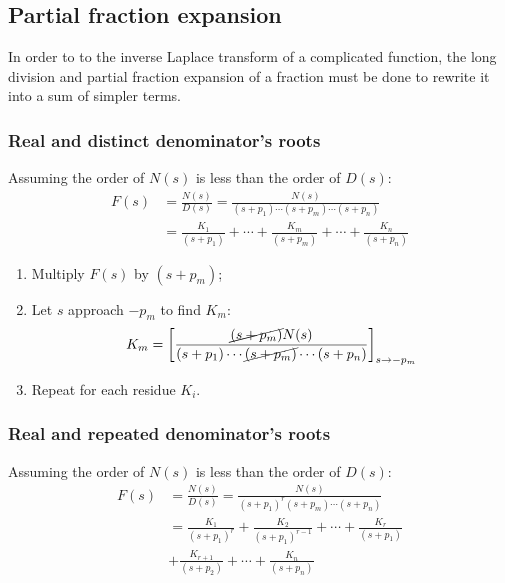 \documentclass[10pt, twocolumn]{article}
\begin{document}
\subsection{Partial fraction expansion}
In order to to the inverse Laplace transform of a complicated function, the long division and partial fraction expansion of a fraction must be done to rewrite it into a sum of simpler terms.


\subsubsection{Real and distinct denominator's roots}
Assuming the order of \(N(s)\) is less than the order of \(D(s)\):
\begin{align*}
  F(s) & = \frac{N(s)}{D(s)} = \frac{N(s)}{(s + p_1) \cdots (s + p_m) \cdots (s + p_n)}            \\
       & = \frac{K_1}{(s + p_1)} + \cdots + \frac{K_m}{(s + p_m)} + \cdots + \frac{K_n}{(s + p_n)}
\end{align*}

\begin{enumerate}
  \item Multiply \(F(s)\) by \((s + p_m)\);
  \item Let \(s\) approach \(- p_m\) to find \(K_m\):
        \[
          K_m = \left[ \frac{\cancel{(s + p_m)} N(s)}{(s + p_1) \cdots \cancel{(s + p_m)} \cdots (s + p_n)} \right]_{s \to -p_m}
        \]
  \item Repeat for each residue \(K_i\).
\end{enumerate}


\subsubsection{Real and repeated denominator's roots}
Assuming the order of \(N(s)\) is less than the order of \(D(s)\):
\begin{align*}
  F(s) & = \frac{N(s)}{D(s)} = \frac{N(s)}{(s + p_1)^r (s + p_m) \cdots (s + p_n)}                  \\
       & = \frac{K_1}{(s + p_1)^r} + \frac{K_2}{(s + p_1)^{r - 1}} + \cdots + \frac{K_r}{(s + p_1)} \\
       & + \frac{K_{r + 1}}{(s + p_2)} + \cdots + \frac{K_n}{(s + p_n)}
\end{align*}
\end{document}
